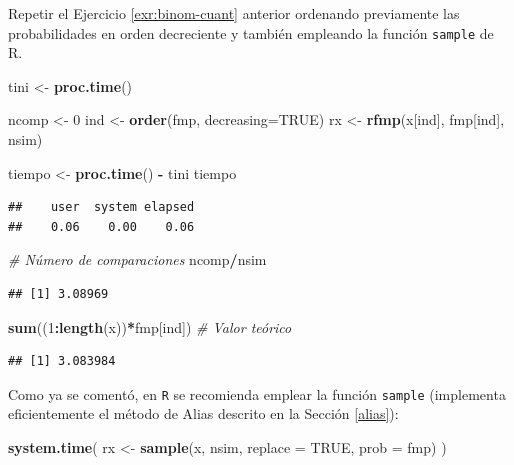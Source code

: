 \documentclass[
]{book}
\newenvironment{Shaded}{\begin{snugshade}}{\end{snugshade}}
\newcommand{\CommentTok}[1]{\textcolor[rgb]{0.56,0.35,0.01}{\textit{#1}}}
\newcommand{\DataTypeTok}[1]{\textcolor[rgb]{0.13,0.29,0.53}{#1}}
\newcommand{\DecValTok}[1]{\textcolor[rgb]{0.00,0.00,0.81}{#1}}
\newcommand{\KeywordTok}[1]{\textcolor[rgb]{0.13,0.29,0.53}{\textbf{#1}}}
\newcommand{\NormalTok}[1]{#1}
\newcommand{\OperatorTok}[1]{\textcolor[rgb]{0.81,0.36,0.00}{\textbf{#1}}}
\newcommand{\OtherTok}[1]{\textcolor[rgb]{0.56,0.35,0.01}{#1}}
\newcommand{\StringTok}[1]{\textcolor[rgb]{0.31,0.60,0.02}{#1}}
\theoremstyle{break}
\theoremstyle{definition}
\theoremstyle{definition}
\theoremstyle{definition}
\theoremstyle{remark}
\begin{document}
Repetir el Ejercicio \ref{exr:binom-cuant} anterior ordenando previamente las
probabilidades en orden decreciente y también empleando la
función \texttt{sample} de R.

\begin{Shaded}
\begin{Highlighting}[]
\NormalTok{tini <-}\StringTok{ }\KeywordTok{proc.time}\NormalTok{()}

\NormalTok{ncomp <-}\StringTok{ }\DecValTok{0}
\NormalTok{ind <-}\StringTok{ }\KeywordTok{order}\NormalTok{(fmp, }\DataTypeTok{decreasing=}\OtherTok{TRUE}\NormalTok{)}
\NormalTok{rx <-}\StringTok{ }\KeywordTok{rfmp}\NormalTok{(x[ind], fmp[ind], nsim)}

\NormalTok{tiempo <-}\StringTok{ }\KeywordTok{proc.time}\NormalTok{() }\OperatorTok{-}\StringTok{ }\NormalTok{tini}
\NormalTok{tiempo}
\end{Highlighting}
\end{Shaded}

\begin{verbatim}
##    user  system elapsed 
##    0.06    0.00    0.06
\end{verbatim}

\begin{Shaded}
\begin{Highlighting}[]
\CommentTok{# Número de comparaciones}
\NormalTok{ncomp}\OperatorTok{/}\NormalTok{nsim}
\end{Highlighting}
\end{Shaded}

\begin{verbatim}
## [1] 3.08969
\end{verbatim}

\begin{Shaded}
\begin{Highlighting}[]
\KeywordTok{sum}\NormalTok{((}\DecValTok{1}\OperatorTok{:}\KeywordTok{length}\NormalTok{(x))}\OperatorTok{*}\NormalTok{fmp[ind]) }\CommentTok{# Valor teórico}
\end{Highlighting}
\end{Shaded}

\begin{verbatim}
## [1] 3.083984
\end{verbatim}

Como ya se comentó, en \texttt{R} se recomienda emplear la función \texttt{sample}
(implementa eficientemente el método de Alias descrito en la Sección \ref{alias}):

\begin{Shaded}
\begin{Highlighting}[]
\KeywordTok{system.time}\NormalTok{( rx <-}\StringTok{ }\KeywordTok{sample}\NormalTok{(x, nsim, }\DataTypeTok{replace =} \OtherTok{TRUE}\NormalTok{, }\DataTypeTok{prob =}\NormalTok{ fmp) )}
\end{Highlighting}
\end{Shaded}
\end{document}
